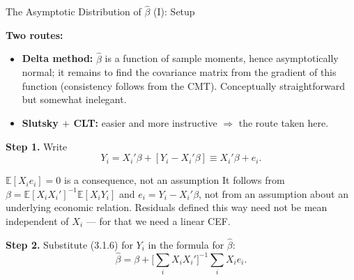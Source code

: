 \documentclass[aspectratio=169,11pt]{beamer}
\newcommand{\E}{\mathbb{E}}
\begin{document}
\begin{frame}{The Asymptotic Distribution of $\hat\beta$ (I): Setup}
\small

\textbf{Two routes:}
\begin{itemize}
    \item \textbf{Delta method:} $\hat\beta$ is a function of sample moments,
    hence asymptotically normal; it remains to find the covariance matrix from
    the gradient of this function (consistency follows from the CMT).
    Conceptually straightforward but somewhat inelegant.
    \item \textbf{Slutsky $+$ CLT:} easier and more instructive
    $\Rightarrow$ the route taken here.
\end{itemize}

\medskip

\textbf{Step 1.} Write
\[
Y_i = X_i'\beta+[Y_i-X_i'\beta]\equiv X_i'\beta+e_i.
\tag{3.1.6}
\]

\begin{alertblock}{$\E[X_ie_i]=0$ is a consequence, not an assumption}
It follows from $\beta=\E[X_iX_i']^{-1}\E[X_iY_i]$ and $e_i=Y_i-X_i'\beta$,
not from an assumption about an underlying economic relation. Residuals
defined this way need not be mean independent of $X_i$ --- for that we need a
linear CEF.
\end{alertblock}

\medskip

\textbf{Step 2.} Substitute (3.1.6) for $Y_i$ in the formula for $\hat\beta$:
\[
\hat\beta = \beta+\Big[\sum_iX_iX_i'\Big]^{-1}\sum_iX_ie_i.
\]

\end{frame}
\end{document}
